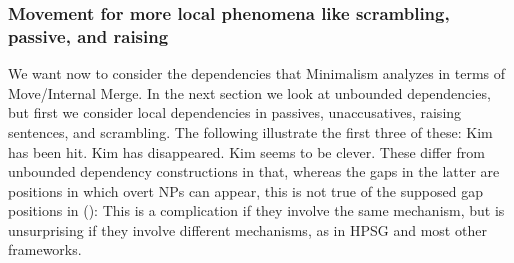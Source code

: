 \documentclass[output=paper
	        ,collection
	        ,collectionchapter
 	        ,biblatex
                ,babelshorthands
                ,newtxmath
                ,draftmode
                ,colorlinks, citecolor=brown
]{langscibook}
\begin{document}
\subsubsection{Movement for more local phenomena like scrambling, passive, and raising}
\label{sec-passive-raising-minimalism}

We want now to consider the dependencies that Minimalism analyzes in terms of Move/Internal
Merge. In the next section we look at unbounded dependencies, but first we consider local
dependencies in passives, unaccusatives, raising sentences, and scrambling. The following illustrate
the first three of these:
\eal\label{ex:min-kim-has-seems}
\ex Kim has been hit.
\ex Kim has disappeared.
\ex Kim seems to be clever.
\zl
These differ from unbounded dependency constructions in that, whereas the gaps in the latter are
positions in which overt NPs can appear, this is not true of the supposed gap positions in ():
\eal
{}
\zl 
This is a complication if they involve the same mechanism, but is unsurprising if they involve
different mechanisms, as in HPSG and most other frameworks.

\end{document}
